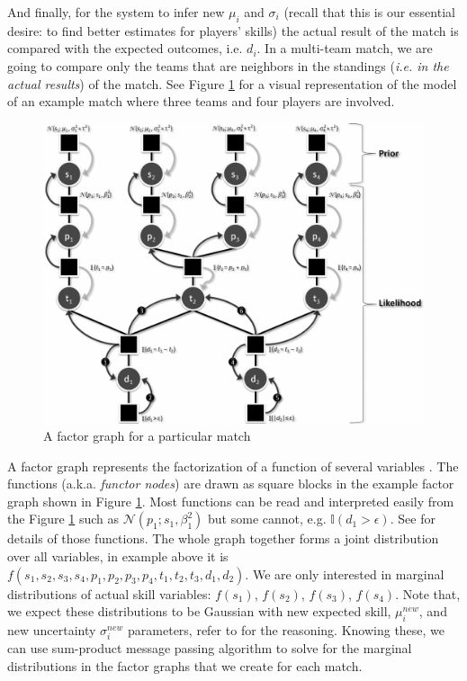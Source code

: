 \documentclass[12pt]{article}
\begin{document}
And finally, for the system to infer new $\mu_i$ and $\sigma_i$ (recall that this is our essential desire: to find better estimates for players' skills) the actual result of the match is compared with the expected outcomes, i.e. $d_i$. In a multi-team match, we are going to compare only the teams that are neighbors in the standings (\textit{i.e. in the actual results}) of the match. See Figure \ref{factorgraph} for a visual representation of the model of an example match where three teams and four players are involved. 

\begin{figure}
	\centering
	\includegraphics[width=0.6\columnwidth]{factorgraph}
	\caption{A factor graph for a particular match}
	\label{factorgraph}
\end{figure}
A factor graph represents the factorization of a function of several variables \cite{loeliger2001factor}. The functions (a.k.a. \textit{functor nodes}) are drawn as square blocks in the example factor graph shown in Figure \ref{factorgraph}. Most functions can be read and interpreted easily from the Figure \ref{factorgraph} such as $\mathcal{N}(p_1;s_1,\beta_1 ^2)$ but some cannot, e.g. $\mathbb{I}(d_1 > \epsilon)$. See \cite{herbrich2006trueskill} for details of those functions. The whole graph together forms a joint distribution over all variables, in example above it is  $f(s_1,s_2,s_3,s_4,p_1,p_2,p_3,p_4,t_1,t_2,t_3,d_1,d_2)$. We are only interested in marginal distributions of actual skill variables: $f(s_1)$, $f(s_2)$, $f(s_3)$, $f(s_4)$. Note that, we expect these distributions to be Gaussian with new expected skill, $\mu^{new}_i$, and new uncertainty $\sigma^{new}_i$ parameters, refer to \cite{herbrich2006trueskill} for the reasoning. Knowing these, we can use sum-product message passing  algorithm \cite{loeliger2001factor} to solve for the marginal distributions in the factor graphs that we create for each match.
\end{document}
